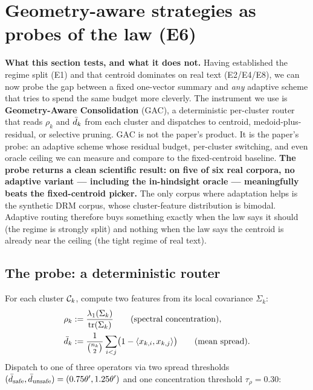 \section{Geometry-aware strategies as probes of the law (E6)}
\label{sec:gac}

\begin{intuition}
\textbf{What this section tests, and what it does not.} Having
established the regime split (E1) and that centroid dominates on
real text (E2/E4/E8), we can now probe the gap between a fixed
one-vector summary and \emph{any} adaptive scheme that tries to
spend the same budget more cleverly. The instrument we use is
\textbf{Geometry-Aware Consolidation} (GAC), a deterministic
per-cluster router that reads $\rho_k$ and $\bar{d}_k$ from each
cluster and dispatches to centroid, medoid-plus-residual, or
selective pruning. GAC is not the paper's product. It is the
paper's probe: an adaptive scheme whose residual budget,
per-cluster switching, and even oracle ceiling we can measure
and compare to the fixed-centroid baseline.
\textbf{The probe returns a clean scientific result: on five of six
real corpora, no adaptive variant --- including the in-hindsight
oracle --- meaningfully beats the fixed-centroid picker.} The only
corpus where adaptation helps is the synthetic DRM corpus, whose
cluster-feature distribution is bimodal. Adaptive routing therefore
buys something exactly when the law says it should (the regime is
strongly split) and nothing when the law says the centroid is
already near the ceiling (the tight regime of real text).
\end{intuition}

\subsection{The probe: a deterministic router}
\label{sec:gac:router}

For each cluster $\mathcal{C}_k$, compute two features from its local
covariance $\Sigma_k$:
\begin{align}
\rho_k &:= \frac{\lambda_1(\Sigma_k)}{\mathrm{tr}(\Sigma_k)}
\qquad\text{(spectral concentration)}, \\
\bar{d}_k &:= \frac{1}{\binom{n_k}{2}} \sum_{i<j}
\bigl(1 - \left\langle x_{k,i},x_{k,j}\right\rangle\bigr)
\qquad\text{(mean spread)}.
\end{align}
Dispatch to one of three operators via two spread thresholds
$(\bar{d}_{\mathrm{safe}}, \bar{d}_{\mathrm{unsafe}}) = (0.75\theta',
1.25\theta')$ and one concentration threshold $\tau_\rho = 0.30$:

